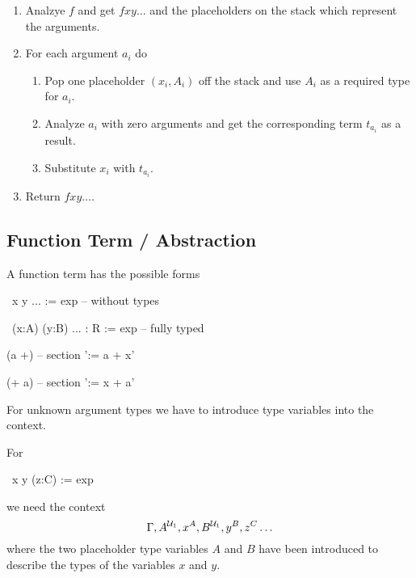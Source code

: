 \begin{enumerate}

\item Analzye $f$ and get $f x y \ldots$ and the placeholders on the stack
  which represent the arguments.


\item For each argument $a_i$ do
  \begin{enumerate}

  \item Pop one placeholder $(x_i,A_i)$ off the stack and use $A_i$ as a
    required type for $a_i$.

  \item Analyze $a_i$ with zero arguments and get the corresponding term
    $t_{a_i}$ as a result.

  \item Substitute $x_i$ with $t_{a_i}$.

  \end{enumerate}

\item Return $f x y \ldots$.

\end{enumerate}






\subsection{Function Term / Abstraction}

A function term has the possible forms

\begin{alba}
  \ x y ... := exp                     -- without types

  \ (x:A) (y:B) ... : R := exp         -- fully typed

  (a +)                                -- section '\x := a + x'

  (+ a)                                -- section '\x := x + a'
\end{alba}


For unknown argument types we have to introduce type variables into the context.

For
\begin{alba}
  \ x y (z:C) := exp
\end{alba}
%
we need the context
$$
    \Gamma, A^{{\cal{U}}_1}, x^A,  B^{{\cal{U}}_1}, y^B, z^C \ldots
$$
%
where the two placeholder type variables $A$ and $B$ have been introduced to
describe the types of the variables $x$ and $y$.

